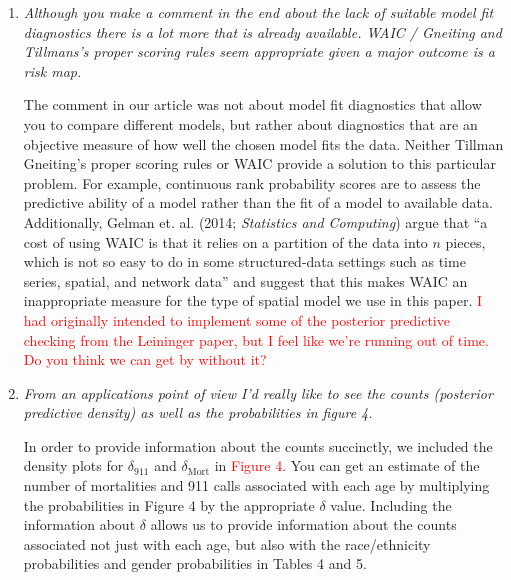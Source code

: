 \documentclass{article}
\begin{document}
\begin{enumerate}
\item\textit{Although you make a comment in the end about the lack of suitable model fit diagnostics there is a lot more that is already available.   WAIC / Gneiting and Tillmans's proper scoring rules seem appropriate given a major outcome is a risk map.}

The comment in our article was not about model fit diagnostics that allow you to compare different models, but rather about diagnostics that are an objective measure of how well the chosen model fits the data. Neither Tillman Gneiting's proper scoring rules or WAIC provide a solution to this particular problem. For example, continuous rank probability scores are to assess the predictive ability of a model rather than the fit of a model to available data. Additionally, Gelman et. al. (2014; \textit{Statistics and Computing}) argue that ``a cost of using WAIC is that it relies on a partition of the data into $n$ pieces, which is not so easy to do in some structured-data settings such as time series, spatial, and network data'' and suggest that this makes WAIC an inappropriate measure for the type of spatial model we use in this paper. \textcolor{red}{I had originally intended to implement some of the posterior predictive checking from the Leininger paper, but I feel like we're running out of time. Do you think we can get by without it?}

\item\textit{From an applications point of view I'd really like to see the counts (posterior predictive density) as well as the probabilities in figure 4.}

In order to provide information about the counts succinctly, we included the density plots for $\delta_{911}$ and $\delta_{\text{Mort}}$ in \textcolor{red}{Figure 4.} You can get an estimate of the number of mortalities and 911 calls associated with each age by multiplying the probabilities in Figure 4 by the appropriate $\delta$ value. Including the information about $\delta$ allows us to provide information about the counts associated not just with each age, but also with the race/ethnicity probabilities and gender probabilities in Tables 4 and 5. 

\end{enumerate}
\end{document}
